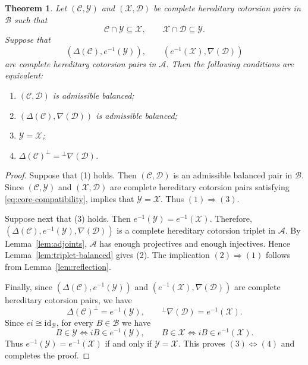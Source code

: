 \documentclass[11pt]{amsart}
\newtheorem{theorem}{Theorem}[section]
\theoremstyle{definition}
\theoremstyle{remark}
\theoremstyle{plain}
\numberwithin{equation}{section}
\begin{document}
\begin{theorem}\label{thm:structural-criterion}
Let $(\mathcal{C}, \mathcal{Y})$ and $(\mathcal{X}, \mathcal{D})$ be complete hereditary cotorsion pairs in $\mathcal{B}$
such that
\begin{equation}\label{eq:core-compatibility}
 \mathcal{C} \cap \mathcal{Y} \subseteq \mathcal{X}, \qquad \mathcal{X} \cap \mathcal{D} \subseteq \mathcal{Y}.
\end{equation}
Suppose that
\[
 (\Delta(\mathcal{C}), e^{-1}(\mathcal{Y})), \qquad
 (e^{-1}(\mathcal{X}), \nabla(\mathcal{D}))
\]
are complete hereditary cotorsion pairs in $\mathcal{A}$. Then the following
conditions are equivalent:
\begin{enumerate}
 \item $(\mathcal{C}, \mathcal{D})$ is admissible balanced;
 \item $(\Delta(\mathcal{C}), \nabla(\mathcal{D}))$ is admissible balanced;
 \item $\mathcal{Y} = \mathcal{X}$;
 \item $\Delta(\mathcal{C})^\perp = {}^\perp\nabla(\mathcal{D})$.
\end{enumerate}
\end{theorem}

\begin{proof}
	Suppose that (1) holds. Then $(\mathcal{C},\mathcal{D})$
	is an admissible balanced pair in $\mathcal{B}$. Since
	$(\mathcal{C},\mathcal{Y})$ and $(\mathcal{X},\mathcal{D})$
	are complete hereditary cotorsion pairs satisfying
	\eqref{eq:core-compatibility}, \cite[Corollary~4.8]{EPZ}
	implies that $\mathcal{Y}=\mathcal{X}$. Thus $(1)\Rightarrow(3)$.
	
	Suppose next that (3) holds. Then $e^{-1}(\mathcal{Y})=e^{-1}(\mathcal{X})$. Therefore,
	$(\Delta(\mathcal{C}),e^{-1}(\mathcal{Y}),
	\nabla(\mathcal{D}))$ is a complete hereditary cotorsion triplet in $\mathcal{A}$.
	By Lemma~\ref{lem:adjoints}, $\mathcal{A}$ has enough
	projectives and enough injectives. Hence
	Lemma~\ref{lem:triplet-balanced} gives (2).
	The implication $(2)\Rightarrow(1)$ follows from
	Lemma~\ref{lem:reflection}.
	
	Finally, since $(\Delta(\mathcal{C}), e^{-1}(\mathcal{Y}))$ and
	$(e^{-1}(\mathcal{X}), \nabla(\mathcal{D}))$ are complete hereditary cotorsion pairs, we have
	\[
	\Delta(\mathcal{C})^\perp=e^{-1}(\mathcal{Y}),
	\qquad
	{}^\perp\nabla(\mathcal{D})=e^{-1}(\mathcal{X}).
	\]
	Since $ei\cong\mathrm{id}_{\mathcal{B}}$, for every $B\in\mathcal{B}$ we have
	\[
	B\in\mathcal{Y}\iff iB\in e^{-1}(\mathcal{Y}),
	\qquad
	B\in\mathcal{X}\iff iB\in e^{-1}(\mathcal{X}).
	\]
	Thus $e^{-1}(\mathcal{Y})=e^{-1}(\mathcal{X})$ if and only if $\mathcal{Y}=\mathcal{X}$. This proves $(3)\Leftrightarrow(4)$ and completes the proof.
\end{proof}
\end{document}
